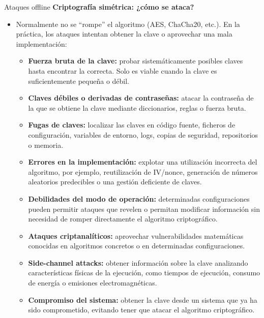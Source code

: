 \documentclass[aspectratio=169,11pt]{beamer}
\newcommand{\lead}[1]{{\bfseries #1}\par\medskip}
\begin{document}
\begin{frame}[allowframebreaks]{Ataques offline}
\small
\lead{Criptografía simétrica: ¿cómo se ataca?}
  \begin{itemize}
  \item Normalmente no se ``rompe'' el algoritmo (AES, ChaCha20, etc.). En la práctica, los ataques intentan obtener la clave o aprovechar una mala implementación:
  \begin{itemize}
    \item \textbf{Fuerza bruta de la clave:} probar sistemáticamente posibles claves hasta encontrar la correcta. Solo es viable cuando la clave es suficientemente pequeña o débil.

    \item \textbf{Claves débiles o derivadas de contraseñas:} atacar la contraseña de la que se obtiene la clave mediante diccionarios, reglas o fuerza bruta.

    \item \textbf{Fugas de claves:} localizar las claves en código fuente, ficheros de configuración, variables de entorno, logs, copias de seguridad, repositorios o memoria.

    \item \textbf{Errores en la implementación:} explotar una utilización incorrecta del algoritmo, por ejemplo, reutilización de IV/nonce, generación de números aleatorios predecibles o una gestión deficiente de claves.

    \item \textbf{Debilidades del modo de operación:} determinadas configuraciones pueden permitir ataques que revelen o permitan modificar información sin necesidad de romper directamente el algoritmo criptográfico.

    \item \textbf{Ataques criptanalíticos:} aprovechar vulnerabilidades matemáticas conocidas en algoritmos concretos o en determinadas configuraciones.

    \item \textbf{Side-channel attacks:} obtener información sobre la clave analizando características físicas de la ejecución, como tiempos de ejecución, consumo de energía o emisiones electromagnéticas.

    \item \textbf{Compromiso del sistema:} obtener la clave desde un sistema que ya ha sido comprometido, evitando tener que atacar el algoritmo criptográfico.
\end{itemize}

\end{itemize}
\end{frame}
\end{document}

